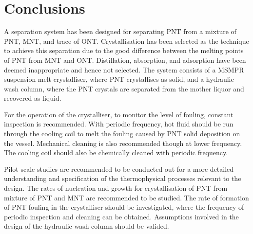 \section{Conclusions}\label{separation conclusions}

A separation system has been designed for separating PNT from a mixture of PNT, MNT, and trace of ONT. Crystallisation has been selected as the technique to achieve this separation due to the good difference between the melting points of PNT from MNT and ONT. Distillation, absorption, and adsorption have been deemed inappropriate and hence not selected. The system consists of a MSMPR suspension melt crystalliser, where PNT crystallises as solid, and a hydraulic wash column, where the PNT crystals are separated from the mother liquor and recovered as liquid. 

For the operation of the crystalliser, to monitor the level of fouling, constant inspection is recommended. With periodic frequency, hot fluid should be run through the cooling coil to melt the fouling caused by PNT solid deposition on the vessel. Mechanical cleaning is also recommended though at lower frequency. The cooling coil should also be chemically cleaned with periodic frequency. 

Pilot-scale studies are recommended to be conducted out for a more detailed understanding and specification of the thermophysical processes relevant to the design. The rates of nucleation and growth for crystallisation of PNT from mixture of PNT and MNT are recommended to be studied. The rate of formation of PNT fouling in the crystalliser should be investigated, where the frequency of periodic inspection and cleaning can be obtained. Assumptions involved in the design of the hydraulic wash column should be valided. 